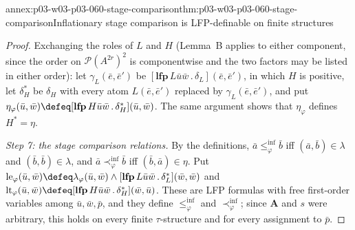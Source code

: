 \begin{annexitem}{annex:p03-w03-p03-060-stage-comparison}{thm:p03-w03-p03-060-stage-comparison}{Inflationary stage comparison is LFP-definable on finite structures}
\begin{proof}
Exchanging the roles of \(L\) and \(H\) (Lemma~B applies to either
component, since the order on \(\mathcal P(A^{2r})^2\) is componentwise and
the two factors may be listed in either order): let
\(\gamma_L(\bar e,\bar e')\) be
\([\mathbf{lfp}\,L\bar u\bar w\,.\,\delta_L](\bar e,\bar e')\), in which
\(H\) is positive, let \(\delta_H^\ast\) be \(\delta_H\) with every atom
\(L(\bar e,\bar e')\) replaced by \(\gamma_L(\bar e,\bar e')\), and put
\(\eta_\varphi(\bar u,\bar w)\defeq[\mathbf{lfp}\,H\bar u\bar w\,.\,\delta_H^\ast](\bar u,\bar w)\).
The same argument shows that \(\eta_\varphi\) defines \(H^\ast=\eta\).

\emph{Step 7: the stage comparison relations.} By the definitions,
\(\bar a\le^{\mathrm{inf}}_\varphi\bar b\) iff \((\bar a,\bar b)\in\lambda\)
and \((\bar b,\bar b)\in\lambda\), and
\(\bar a\prec^{\mathrm{inf}}_\varphi\bar b\) iff
\((\bar b,\bar a)\in\eta\). Put
\(\mathrm{le}_\varphi(\bar u,\bar w)\defeq\lambda_\varphi(\bar u,\bar w)\wedge[\mathbf{lfp}\,L\bar u\bar w\,.\,\delta_L^\ast](\bar w,\bar w)\)
and
\(\mathrm{lt}_\varphi(\bar u,\bar w)\defeq[\mathbf{lfp}\,H\bar u\bar w\,.\,\delta_H^\ast](\bar w,\bar u)\).
These are LFP formulas with free first-order variables among
\(\bar u,\bar w,\bar p\), and they define \(\le^{\mathrm{inf}}_\varphi\) and
\(\prec^{\mathrm{inf}}_\varphi\); since \(\mathbf A\) and \(s\) were
arbitrary, this holds on every finite \(\tau\)-structure and for every
assignment to \(\bar p\).
\end{proof}
\end{annexitem}

